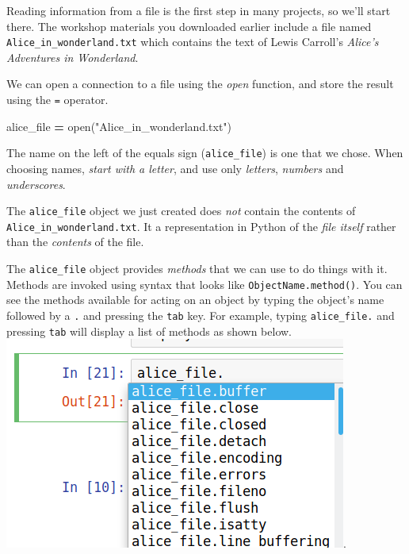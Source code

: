 \documentclass[]{book}
\newenvironment{Shaded}{\begin{snugshade}}{\end{snugshade}}
\newcommand{\StringTok}[1]{\textcolor[rgb]{0.31,0.60,0.02}{#1}}
\newcommand{\OperatorTok}[1]{\textcolor[rgb]{0.81,0.36,0.00}{\textbf{#1}}}
\newcommand{\BuiltInTok}[1]{#1}
\newcommand{\NormalTok}[1]{#1}
\begin{document}
Reading information from a file is the first step in many projects, so
we'll start there. The workshop materials you downloaded earlier include
a file named \texttt{Alice\_in\_wonderland.txt} which contains the text
of Lewis Carroll's \emph{Alice's Adventures in Wonderland}.

We can open a connection to a file using the \emph{open} function, and
store the result using the \texttt{=} operator.

\begin{Shaded}
\begin{Highlighting}[]
\NormalTok{alice_file }\OperatorTok{=} \BuiltInTok{open}\NormalTok{(}\StringTok{"Alice_in_wonderland.txt"}\NormalTok{)}
\end{Highlighting}
\end{Shaded}

The name on the left of the equals sign (\texttt{alice\_file}) is one
that we chose. When choosing names, \emph{start with a letter}, and use
only \emph{letters}, \emph{numbers} and \emph{underscores}.

The \texttt{alice\_file} object we just created does \emph{not} contain
the contents of \texttt{Alice\_in\_wonderland.txt}. It a representation
in Python of the \emph{file itself} rather than the \emph{contents} of
the file.

The \texttt{alice\_file} object provides \emph{methods} that we can use
to do things with it. Methods are invoked using syntax that looks like
\texttt{ObjectName.method()}. You can see the methods available for
acting on an object by typing the object's name followed by a \texttt{.}
and pressing the \texttt{tab} key. For example, typing
\texttt{alice\_file.} and pressing \texttt{tab} will display a list of
methods as shown below.
\includegraphics{Python/PythonIntro/images/notebook_file_completion.png}.
\end{document}
